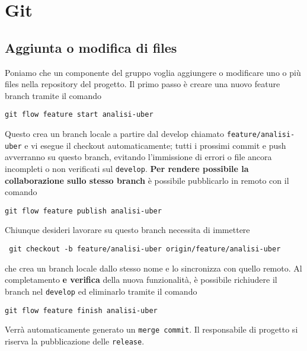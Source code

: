

\chapter{Git}

\section{Aggiunta o modifica di files}
Poniamo che un componente del gruppo voglia aggiungere o modificare uno o più files nella repository del progetto.
Il primo passo è creare una nuovo feature branch tramite il comando
\begin{lstlisting}
git flow feature start analisi-uber
\end{lstlisting}
Questo crea un branch locale a partire dal develop chiamato \texttt{feature/analisi-uber} e vi esegue il checkout automaticamente; tutti i prossimi commit e push avverranno su questo branch, evitando l'immissione di errori o file ancora incompleti o non verificati sul \texttt{develop}.
\textbf{Per rendere possibile la collaborazione sullo stesso branch} è possibile pubblicarlo in remoto con il comando
\begin{lstlisting}
git flow feature publish analisi-uber
\end{lstlisting}
Chiunque desideri lavorare su questo branch necessita di immettere
\begin{lstlisting}
 git checkout -b feature/analisi-uber origin/feature/analisi-uber
\end{lstlisting}
che crea un branch locale dallo stesso nome e lo sincronizza con quello remoto.
Al completamento \textbf{e verifica} della nuova funzionalità, è possibile richiudere il branch nel \texttt{develop} ed eliminarlo tramite il comando
\begin{lstlisting}
git flow feature finish analisi-uber
\end{lstlisting}
Verrà automaticamente generato un \texttt{merge commit}.
Il responsabile di progetto si riserva la pubblicazione delle \texttt{release}.


